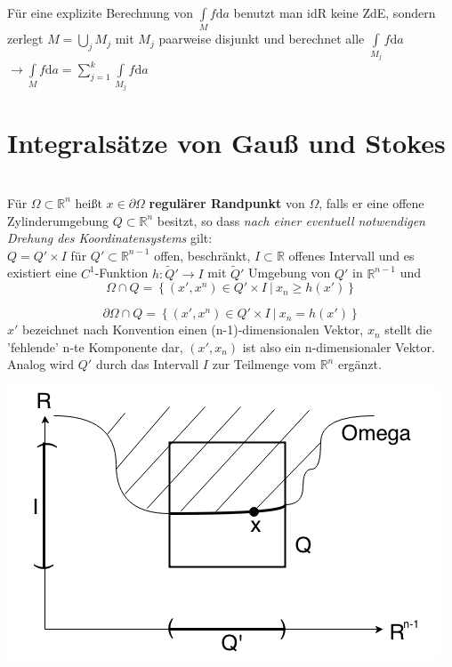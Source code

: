 Für eine explizite Berechnung von $\int\limits_M f \mathrm{d}a $
benutzt man idR keine ZdE, sondern zerlegt 
$M = \bigcup\limits_j M_j $ mit $M_j $ paarweise disjunkt und berechnet alle
$\int\limits_{M_j} f \mathrm{d}a $ \\
$\longrightarrow \int\limits_M f \mathrm{d}a 
= \sum\limits_{j=1}^k \int\limits_{M_j} f \mathrm{d}a $

\section{Integralsätze von Gauß und Stokes}

\begin{definition}
    \mbox{} \\
    Für $\Omega \subset \mathbb{R}^n $ heißt $x \in \partial \Omega $
    \textbf{regulärer Randpunkt} von $\Omega $, falls er eine offene Zylinderumgebung
    $Q \subset \mathbb{R}^n $ besitzt, so dass 
    \emph{nach einer eventuell notwendigen Drehung des Koordinatensystems} gilt:\\
    $Q = Q' \times I $ für $Q' \subset \mathbb{R}^{n-1} $ offen, beschränkt, 
    $I \subset \mathbb{R} $ offenes Intervall und es existiert eine $C^1 $-Funktion
    $h: \tilde{Q}' \rightarrow I $ mit $\tilde{Q}' $ Umgebung von $Q' $
    in $\mathbb{R}^{n-1} $ und \\
    \begin{equation*}
        \Omega \cap Q = 
        \left\lbrace \left(x', x^n \right) \in Q' \times I \ |\ x_n \geq h(x') 
        \right\rbrace
    \end{equation*}        
     
    \begin{equation}
        \partial\Omega \cap Q = 
        \left\lbrace \left(x', x^n \right) \in Q' \times I \ |\ x_n = h(x') \right\rbrace
    \end{equation}
    $x'$ bezeichnet nach Konvention einen (n-1)-dimensionalen Vektor, $x_n$ stellt die
    'fehlende' n-te Komponente dar, $(x', x_n) $ ist also ein n-dimensionaler Vektor.
    Analog wird $Q'$ durch das Intervall $I$ zur Teilmenge vom $\mathbb{R}^n $ ergänzt.
    \begin{center}
    	\includegraphics[scale=0.4]{pictures/007-01}
    \end{center}
    

\end{definition}
